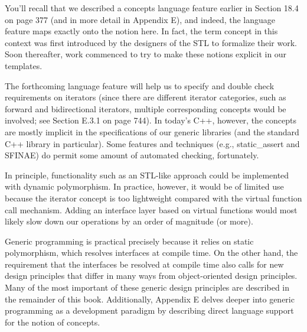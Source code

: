 You’ll recall that we described a concepts language feature earlier in Section 18.4 on page 377 (and in more detail in Appendix E), and indeed, the language feature maps exactly onto the notion here. In fact, the term concept in this context was first introduced by the designers of the STL to formalize their work. Soon thereafter, work commenced to try to make these notions explicit in our templates.

The forthcoming language feature will help us to specify and double check requirements on iterators (since there are different iterator categories, such as forward and bidirectional iterators, multiple corresponding concepts would be involved; see Section E.3.1 on page 744). In today’s C++, however, the concepts are mostly implicit in the specifications of our generic libraries (and the standard C++ library in particular). Some features and techniques (e.g., static\_assert and SFINAE) do permit some amount of automated checking, fortunately.

In principle, functionality such as an STL-like approach could be implemented with dynamic polymorphism. In practice, however, it would be of limited use because the iterator concept is too lightweight compared with the virtual function call mechanism. Adding an interface layer based on virtual functions would most likely slow down our operations by an order of magnitude (or more).

Generic programming is practical precisely because it relies on static polymorphism, which resolves interfaces at compile time. On the other hand, the requirement that the interfaces be resolved at compile time also calls for new design principles that differ in many ways from object-oriented design principles. Many of the most important of these generic design principles are described in the remainder of this book. Additionally, Appendix E delves deeper into generic programming as a development paradigm by describing direct language support for the notion of concepts.























